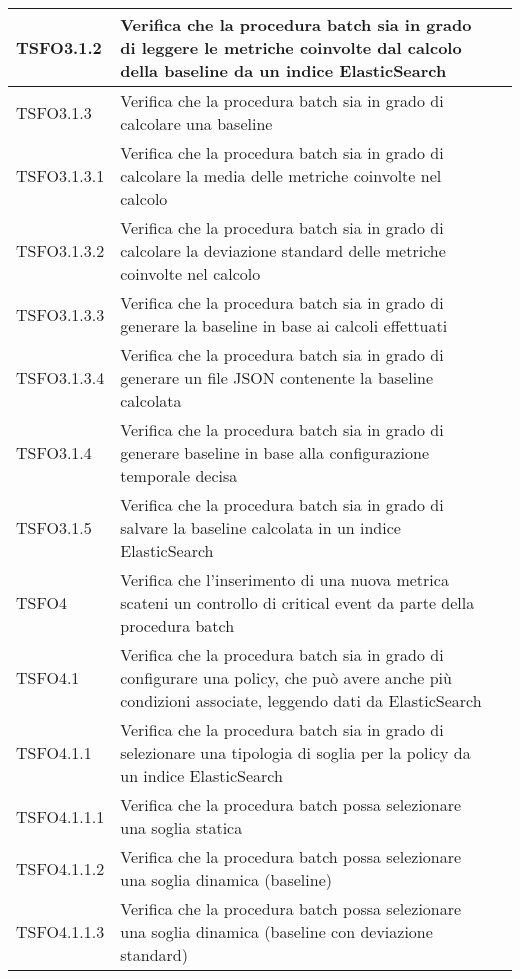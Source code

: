 \begin{center}
\begin{longtable}{ | >{\centering\arraybackslash}m{2.5cm} | >{\raggedright\arraybackslash}m{9cm} | >{\centering\arraybackslash}m{3.5cm} | }
				TSFO3.1.2 & Verifica che la procedura batch sia in grado di 
							leggere le metriche coinvolte dal calcolo della baseline da un indice ElasticSearch
						& \donetext{} \\ \hline
				TSFO3.1.3 & Verifica che la procedura batch sia in grado di calcolare una baseline & \donetext{} \\ \hline
				TSFO3.1.3.1 & Verifica che la procedura batch sia in grado di calcolare la media delle metriche coinvolte nel calcolo & \donetext{} \\ \hline
				TSFO3.1.3.2 & Verifica che la procedura batch sia in grado di calcolare la deviazione standard delle metriche coinvolte nel calcolo & \donetext{} \\ \hline
				TSFO3.1.3.3 & Verifica che la procedura batch sia in grado di generare la baseline in base ai calcoli effettuati & \donetext{} \\ \hline
				TSFO3.1.3.4 & Verifica che la procedura batch sia in grado di generare un ﬁle JSON contenente la baseline calcolata
 & \donetext{} \\ \hline
				TSFO3.1.4 & Verifica che la procedura batch sia in grado di generare baseline in base alla conﬁgurazione temporale decisa
 & \donetext{} \\ \hline
				TSFO3.1.5 & Verifica che la procedura batch sia in grado di salvare la baseline calcolata in un indice ElasticSearch & \donetext{} \\ \hline
				TSFO4 & Verifica che l'inserimento di una nuova metrica scateni un controllo di critical event da parte della
						procedura batch & \donetext{} \\ \hline
				TSFO4.1 & Verifica che la procedura batch sia in grado di configurare una policy, che può avere anche più condizioni associate, leggendo dati da ElasticSearch & \donetext{} \\ \hline
				TSFO4.1.1 & Verifica che la procedura batch sia in grado di selezionare una tipologia di soglia per la policy da un indice
							ElasticSearch & \donetext{} \\ \hline
				TSFO4.1.1.1 & Verifica che la procedura batch possa selezionare una soglia statica & \donetext{} \\ \hline
				TSFO4.1.1.2 & Verifica che la procedura batch possa selezionare una soglia dinamica (baseline) & \donetext{} \\ \hline
				TSFO4.1.1.3 & Verifica che la procedura batch possa selezionare una soglia dinamica (baseline con deviazione standard) & \donetext{} \\ \hline

\end{longtable}
\end{center}
